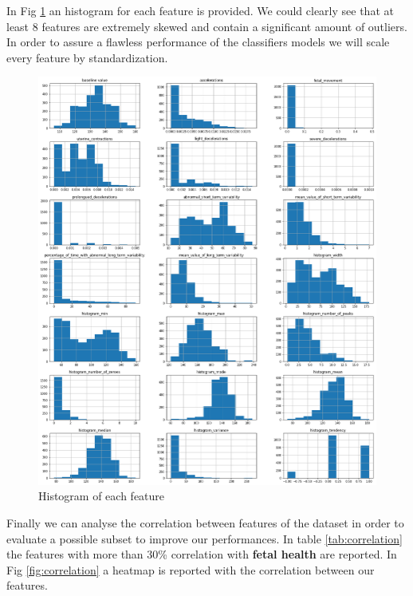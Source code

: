 \documentclass[a4paper,12pt]{article}
\begin{document}
\bigbreak
\noindent In Fig \ref{fig:hist} an histogram for each feature is provided. We could clearly see that at least 8 features are extremely skewed and contain a significant amount of outliers. In order to assure a flawless performance of the classifiers models we will scale every feature by standardization.

\begin{figure}[H]
  \begin{center}
  \includegraphics[width=1.0\textwidth]{images/hist.png}
  \end{center}
  \caption{Histogram of each feature}
  \label{fig:hist}
\end{figure}

\bigbreak
\noindent Finally we can analyse the correlation between features of the dataset in order to evaluate a possible subset to improve our performances. In table \ref{tab:correlation} the features with more than 30\% correlation with \textbf{fetal health} are reported.
In Fig \ref{fig:correlation} a heatmap is reported with the correlation between our features.
\end{document}

